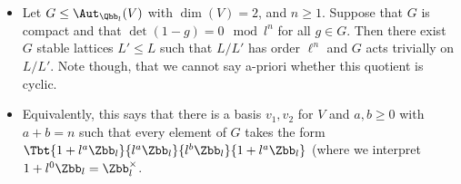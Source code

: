 \documentclass{amsart}
\begin{document}
\begin{itemize}
   \item Let $G \leq \Aut_{\Qbb_l} (V)$ with $\dim(V)=2$, and $n\geq 1$. Suppose that $G$ is compact and that $\det(1-g) = 0 \mod l^n$ for all $g\in G$.  Then there exist $G$ stable lattices $L'\leq L$ such that $L/L'$ has order $\ell^n$ and $G$ acts trivially on $L/L'$. Note though, that we cannot say a-priori whether this quotient is cyclic.
   \item Equivalently, this says that there is a basis $v_1,v_2$ for $V$ and $a,b \geq 0$ with $a+b =n$ such that every element of $G$ takes the form $\Tbt{1+l^a \Zbb_l}{l^a \Zbb_l}{l^b \Zbb_l}{1+l^a \Zbb_l}$ (where we interpret $1+l^0 \Zbb_l = \Zbb_l^\times$.

\end{itemize}
\end{document}

